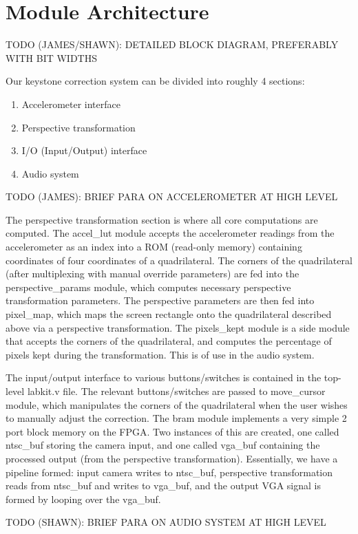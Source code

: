 \documentclass{article}
\begin{document}
\section{Module Architecture}
TODO (JAMES/SHAWN): DETAILED BLOCK DIAGRAM, PREFERABLY WITH BIT WIDTHS

Our keystone correction system can be divided into roughly 4 sections:
\begin{enumerate}
\item Accelerometer interface
\item Perspective transformation
\item  I/O (Input/Output) interface
\item Audio system
\end{enumerate}

TODO (JAMES): BRIEF PARA ON ACCELEROMETER AT HIGH LEVEL

The perspective transformation section is where all core computations are computed.
The accel\_lut module accepts the accelerometer readings from the accelerometer as an index into a ROM (read-only memory) containing coordinates of four coordinates of a quadrilateral.
The corners of the quadrilateral (after multiplexing with manual override parameters) are fed into the perspective\_params module, which computes necessary perspective transformation parameters.
The perspective parameters are then fed into pixel\_map, which maps the screen rectangle onto the quadrilateral described above via a perspective transformation.
The pixels\_kept module is a side module that accepts the corners of the quadrilateral, and computes the percentage of pixels kept during the transformation.
This is of use in the audio system.

The input/output interface to various buttons/switches is contained in the top-level labkit.v file.
The relevant buttons/switches are passed to move\_cursor module, which manipulates the corners of the quadrilateral when the user wishes to manually adjust the correction.
The bram module implements a very simple 2 port block memory on the FPGA.
Two instances of this are created, one called ntsc\_buf storing the camera input, and one called vga\_buf containing the processed output (from the perspective transformation).
Essentially, we have a pipeline formed:
input camera writes to ntsc\_buf, perspective transformation reads from ntsc\_buf and writes to vga\_buf, and the output VGA signal is formed by looping over the vga\_buf.

TODO (SHAWN): BRIEF PARA ON AUDIO SYSTEM AT HIGH LEVEL
\end{document}
